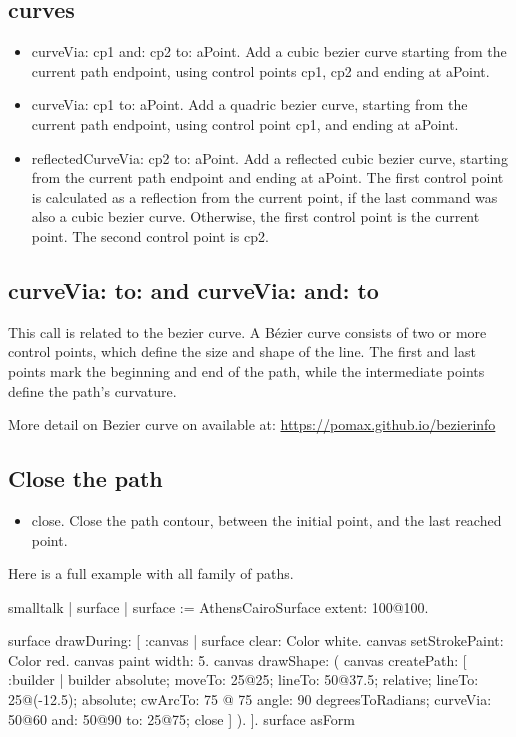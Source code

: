 \documentclass[10pt,twoside,english]{_support/latex/sbabook/sbabook}
\begin{document}
\subsection{curves}
\begin{itemize}
    \item curveVia: cp1 and: cp2 to: aPoint. Add a cubic bezier curve starting from the current path endpoint, using control points cp1, cp2 and ending at aPoint.
    \item curveVia: cp1 to: aPoint. Add a quadric bezier curve, starting from the current path endpoint, using control point cp1, and ending at aPoint.
    \item reflectedCurveVia: cp2 to: aPoint. Add a reflected cubic bezier curve, starting from the current path endpoint and ending at aPoint. The first control point is calculated as a reflection from the current point, if the last command was also a cubic bezier curve. Otherwise, the first control point is the current point. The second control point is cp2.
\end{itemize}

\subsection{curveVia: to: and \textbar{}curveVia: and: to}
This call is related to the bezier curve. A B\'{e}zier curve consists of two or more
control points, which define the size and shape of the line. The first and
last points mark the beginning and end of the path, while the intermediate
points define the path's curvature.

More detail on Bezier curve on available at: \href{https://pomax.github.io/bezierinfo}{https://pomax.github.io/bezierinfo}

\subsection{Close the path}
\begin{itemize}
    \item close. Close the path contour, between the initial point, and the last reached point.
\end{itemize}

Here is a full example with all family of paths.
\begin{displaycode}{smalltalk}
| surface |
surface := AthensCairoSurface extent: 100@100.

surface drawDuring: [ :canvas |
 surface clear: Color white.
   canvas setStrokePaint: Color red.
 canvas paint width: 5.
   canvas drawShape: (
  canvas createPath: [ :builder | 
       builder
        absolute;
      moveTo: 25@25;
      lineTo: 50@37.5;
   relative;
      lineTo: 25@(-12.5);
   absolute;
   cwArcTo: 75 @ 75 angle: 90 degreesToRadians;
   curveVia: 50@60 and: 50@90 to: 25@75;
      close
  ]
 ).
].
surface asForm 
\end{displaycode}
\end{document}
